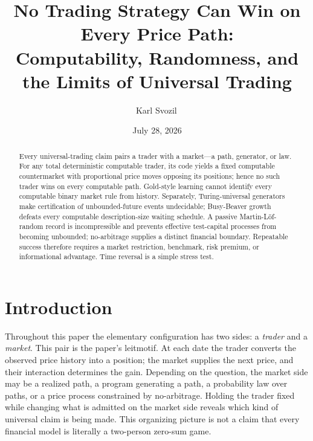\documentclass[aps,pra,reprint,superscriptaddress,amsmath,amssymb,floatfix]{revtex4-2}
\theoremstyle{plain}
\theoremstyle{definition}
\theoremstyle{remark}
\begin{document}
\title{No Trading Strategy Can Win on Every Price Path:\\
Computability, Randomness, and the Limits of Universal Trading}

\author{Karl Svozil\,}

\date{July 28, 2026}

\begin{abstract}
Every universal-trading claim pairs a trader with a market---a path, generator,
or law. For any total deterministic computable trader, its code yields a fixed
computable countermarket with proportional price moves opposing its positions;
hence no such trader wins on every computable path. Gold-style learning cannot
identify every computable binary market rule from history. Separately,
Turing-universal generators make certification of unbounded-future events
undecidable; Busy-Beaver growth defeats every computable description-size
waiting schedule. A passive Martin-L\"of-random record is incompressible and
prevents effective test-capital processes from becoming unbounded;
no-arbitrage supplies a distinct financial boundary. Repeatable success
therefore requires a market restriction, benchmark, risk premium, or
informational advantage. Time reversal is a simple stress test.
\end{abstract}

\maketitle

\section{Introduction}
\label{sec:intro}

Throughout this paper the elementary configuration has two sides: a
\emph{trader} and a \emph{market}. This pair is the paper's leitmotif. At each
date the trader converts the observed price history into a position; the
market supplies the next price, and their interaction determines the gain.
Depending on the question, the market side may be a realized path, a program
generating a path, a probability law over paths, or a price process constrained
by no-arbitrage. Holding the trader fixed while changing what is admitted on
the market side reveals which kind of universal claim is being made. This
organizing picture is not a claim that every financial model is literally a
two-person zero-sum game.
\end{document}
